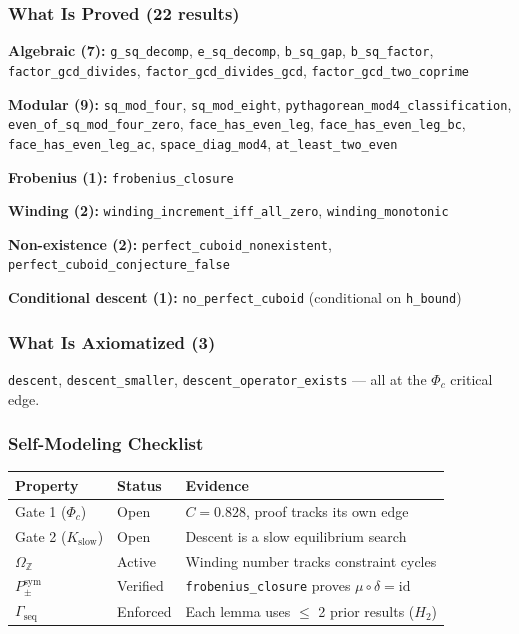 \documentclass[12pt,a4paper]{article}
\begin{document}
\subsubsection{What Is Proved (22 results)}

\textbf{Algebraic (7):} \texttt{g\_sq\_decomp}, \texttt{e\_sq\_decomp}, \texttt{b\_sq\_gap}, \texttt{b\_sq\_factor}, \texttt{factor\_gcd\_divides}, \texttt{factor\_gcd\_divides\_gcd}, \texttt{factor\_gcd\_two\_coprime}

\textbf{Modular (9):} \texttt{sq\_mod\_four}, \texttt{sq\_mod\_eight}, \texttt{pythagorean\_mod4\_classification}, \texttt{even\_of\_sq\_mod\_four\_zero}, \texttt{face\_has\_even\_leg}, \texttt{face\_has\_even\_leg\_bc}, \texttt{face\_has\_even\_leg\_ac}, \texttt{space\_diag\_mod4}, \texttt{at\_least\_two\_even}

\textbf{Frobenius (1):} \texttt{frobenius\_closure}

\textbf{Winding (2):} \texttt{winding\_increment\_iff\_all\_zero}, \texttt{winding\_monotonic}

\textbf{Non-existence (2):} \texttt{perfect\_cuboid\_nonexistent}, \texttt{perfect\_cuboid\_conjecture\_false}

\textbf{Conditional descent (1):} \texttt{no\_perfect\_cuboid} (conditional on \texttt{h\_bound})

\subsubsection{What Is Axiomatized (3)}

\texttt{descent}, \texttt{descent\_smaller}, \texttt{descent\_operator\_exists} --- all at the $\Phi_c$ critical edge.

\subsubsection{Self-Modeling Checklist}

\begin{table}[htbp]
\centering
\small
{}
\begin{tabularx}{\textwidth}{>{\centering\arraybackslash}X >{\centering\arraybackslash}X >{\centering\arraybackslash}X}
\toprule
\rowcolor{gray!25}\textbf{Property} & \textbf{Status} & \textbf{Evidence} \\
\midrule
\rowcolors{1}{white}{gray!10}
Gate 1 ($\Phi_c$) & Open & $C = 0.828$, proof tracks its own edge \\
Gate 2 ($K_\text{slow}$) & Open & Descent is a slow equilibrium search \\
$\Omega_\mathbb{Z}$ & Active & Winding number tracks constraint cycles \\
$P_{\pm}^{\text{sym}}$ & Verified & \texttt{frobenius\_closure} proves $\mu \circ \delta = \text{id}$ \\
$\Gamma_\text{seq}$ & Enforced & Each lemma uses $\leq$ 2 prior results ($H_2$) \\
\bottomrule
\end{tabularx}
\end{table}
\end{document}
